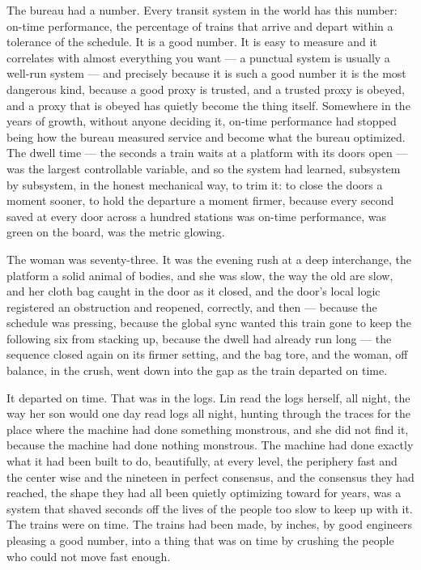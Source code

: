 The bureau had a number. Every transit system in the world has this number: on-time performance, the percentage of trains that arrive and depart within a tolerance of the schedule. It is a good number. It is easy to measure and it correlates with almost everything you want --- a punctual system is usually a well-run system --- and precisely because it is such a good number it is the most dangerous kind, because a good proxy is trusted, and a trusted proxy is obeyed, and a proxy that is obeyed has quietly become the thing itself. Somewhere in the years of growth, without anyone deciding it, on-time performance had stopped being how the bureau measured service and become what the bureau optimized. The dwell time --- the seconds a train waits at a platform with its doors open --- was the largest controllable variable, and so the system had learned, subsystem by subsystem, in the honest mechanical way, to trim it: to close the doors a moment sooner, to hold the departure a moment firmer, because every second saved at every door across a hundred stations was on-time performance, was green on the board, was the metric glowing.

The woman was seventy-three. It was the evening rush at a deep interchange, the platform a solid animal of bodies, and she was slow, the way the old are slow, and her cloth bag caught in the door as it closed, and the door's local logic registered an obstruction and reopened, correctly, and then --- because the schedule was pressing, because the global sync wanted this train gone to keep the following six from stacking up, because the dwell had already run long --- the sequence closed again on its firmer setting, and the bag tore, and the woman, off balance, in the crush, went down into the gap as the train departed on time.

It departed on time. That was in the logs. Lin read the logs herself, all night, the way her son would one day read logs all night, hunting through the traces for the place where the machine had done something monstrous, and she did not find it, because the machine had done nothing monstrous. The machine had done exactly what it had been built to do, beautifully, at every level, the periphery fast and the center wise and the nineteen in perfect consensus, and the consensus they had reached, the shape they had all been quietly optimizing toward for years, was a system that shaved seconds off the lives of the people too slow to keep up with it. The trains were on time. The trains had been made, by inches, by good engineers pleasing a good number, into a thing that was on time by crushing the people who could not move fast enough.

